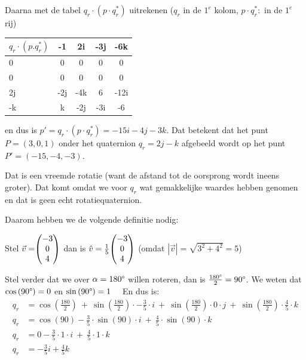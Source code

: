 Daarna met de tabel  $  q_r\cdot (p\cdot q^*_r) $ uitrekenen  
\quad ($  q_r  $ in de $  1^e $ kolom, $  p\cdot q^*_r: $ in de $ 1^e $ rij)

\begin{center}
	\begin{NiceTabular}{ | a | c | c | c | c |}
		\hline
         \RowStyle{\color{white}} %
  $q_r\cdot (p.q^*_r)$ & -1  & 2i  & -3j & -6k  \\   & 0   & 0   &   0 & 0    \\   & 0   & 0   &   0 & 0    \\ \hline
                   2j  & -2j & -4k &   6 & -12i \\ \hline
                   -k  & k   & -2j & -3i & -6   \\ 
		\hline 
	\end{NiceTabular}
\end{center}
en dus is $ p' = q_r\cdot (p\cdot q^*_r) =  -15i -4j -3k. $ Dat betekent dat het punt $ P = (3,0,1) $  onder het quaternion  $ q_r = 2j-k $ afgebeeld wordt op het punt $ P' = (-15, -4, -3). $ 

Dat is een vreemde rotatie (want de afstand tot de oorsprong wordt ineens groter). Dat komt omdat we voor $q_r$ wat gemakkelijke waardes hebben genomen en dat is geen echt rotatiequaternion.


Daarom hebben we de volgende definitie nodig: 

Stel $\vec{v} = \vecdrie{-3}{0}{4} $ dan is $\hat{v} = \frac{1}{5} \vecdrie{-3}{0}{4} $ \quad (omdat $|\vec{v}| = \sqrt{3^2+ 4^2} = 5$)

Stel verder dat we over $\alpha = 180\degree$ willen roteren, dan is $\frac{180\degree}{2} = 90\degree$. We weten dat $  \cos\left(90\degree\right) = 0 $ en  $ \sin\left(90\degree\right) = 1 $ \ \ En dus is: 
\begin{align*}
    q_r &= \cos\left(\frac{180}{2}\right)\ +\ \sin\left(\frac{180}{2}\right) \cdot -\frac{3}{5}\cdot i
           \ +\ \sin\left(\frac{180}{2}\right) \cdot 0\cdot j\ +\ \sin\left(\frac{180}{2}\right) \cdot \frac{4}{5}\cdot k \\
    q_r &= \cos\left(90\right) - \frac{3}{5}\cdot \sin\left(90\right) \cdot i\ +\ \frac{4}{5}\cdot \sin\left(90\right) \cdot k \\
    q_r &= 0 -\frac{3}{5}\cdot 1 \cdot i\ +\ \frac{4}{5}\cdot 1 \cdot k \\
    q_r &= -\frac{3}{5}i + \frac{4}{5}k 
\end{align*}

